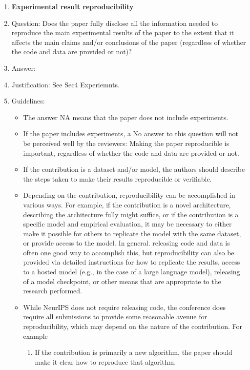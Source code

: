 \documentclass{article}
\begin{document}
\begin{enumerate}
    \item {\bf Experimental result reproducibility}
    \item[] Question: Does the paper fully disclose all the information needed to reproduce the main experimental results of the paper to the extent that it affects the main claims and/or conclusions of the paper (regardless of whether the code and data are provided or not)?
    \item[] Answer: \answerYes{} %
    \item[] Justification: See Sec4 Experiemnts.
    \item[] Guidelines:
    \begin{itemize}
        \item The answer NA means that the paper does not include experiments.
        \item If the paper includes experiments, a No answer to this question will not be perceived well by the reviewers: Making the paper reproducible is important, regardless of whether the code and data are provided or not.
        \item If the contribution is a dataset and/or model, the authors should describe the steps taken to make their results reproducible or verifiable. 
        \item Depending on the contribution, reproducibility can be accomplished in various ways. For example, if the contribution is a novel architecture, describing the architecture fully might suffice, or if the contribution is a specific model and empirical evaluation, it may be necessary to either make it possible for others to replicate the model with the same dataset, or provide access to the model. In general. releasing code and data is often one good way to accomplish this, but reproducibility can also be provided via detailed instructions for how to replicate the results, access to a hosted model (e.g., in the case of a large language model), releasing of a model checkpoint, or other means that are appropriate to the research performed.
        \item While NeurIPS does not require releasing code, the conference does require all submissions to provide some reasonable avenue for reproducibility, which may depend on the nature of the contribution. For example
        \begin{enumerate}
            \item If the contribution is primarily a new algorithm, the paper should make it clear how to reproduce that algorithm.

\end{enumerate}
\end{itemize}
\end{enumerate}
\end{document}
